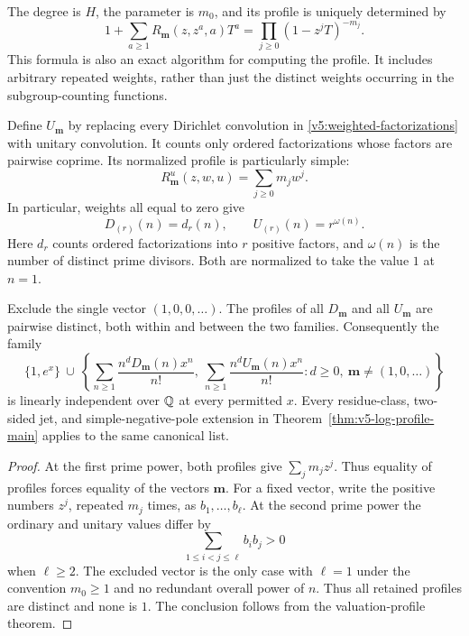 The degree is $H$, the parameter is $m_0$, and its profile is uniquely
determined by
\begin{equation}\label{v5:weighted-factorization-local}
 1+\sum_{a\geq1}R_{\mathbf m}(z,z^a,a)T^a
       =\prod_{j\geq0}(1-z^jT)^{-m_j}.
\end{equation}
This formula is also an exact algorithm for computing the profile.
It includes arbitrary repeated weights, rather than just the distinct
weights occurring in the subgroup-counting functions.

Define $U_{\mathbf m}$ by replacing every Dirichlet convolution in
\eqref{v5:weighted-factorizations} with unitary convolution.  It counts
only ordered factorizations whose factors are pairwise coprime.  Its
normalized profile is particularly simple:
\begin{equation}\label{v5:unitary-factorization-profile}
 R^u_{\mathbf m}(z,w,u)=\sum_{j\geq0}m_jw^j.
\end{equation}
In particular, weights all equal to zero give
\[
 D_{(r)}(n)=d_r(n),\qquad U_{(r)}(n)=r^{\omega(n)}.
\]
Here $d_r$ counts ordered factorizations into $r$ positive factors,
and $\omega(n)$ is the number of distinct prime divisors.  Both are
normalized to take the value $1$ at $n=1$.

\begin{corollary}
\label{v5:factorization-hierarchy}
Exclude the single vector $(1,0,0,\ldots)$.  The profiles of all
$D_{\mathbf m}$ and all $U_{\mathbf m}$ are pairwise distinct, both
within and between the two families.  Consequently the family
\[
 \{1,e^x\}\ \cup\
 \left\{\sum_{n\geq1}\frac{n^dD_{\mathbf m}(n)x^n}{n!},\
        \sum_{n\geq1}\frac{n^dU_{\mathbf m}(n)x^n}{n!}:
                d\geq0,\ \mathbf m\ne(1,0,\ldots)\right\}
\]
is linearly independent over $\mathbb Q$ at every permitted $x$.
Every residue-class, two-sided jet, and simple-negative-pole extension
in Theorem~\ref{thm:v5-log-profile-main} applies to the same canonical list.
\end{corollary}
\begin{proof}
At the first prime power, both profiles give
$\sum_jm_jz^j$.  Thus equality of profiles forces equality of the
vectors $\mathbf m$.  For a fixed vector, write the positive numbers
$z^j$, repeated $m_j$ times, as $b_1,\ldots,b_\ell$.  At the second
prime power the ordinary and unitary values differ by
\[
 \sum_{1\leq i<j\leq\ell}b_ib_j>0
\]
when $\ell\geq2$.  The excluded vector is the only case with
$\ell=1$ under the convention $m_0\geq1$ and no redundant overall
power of $n$.  Thus all retained profiles are distinct and none is $1$.
The conclusion follows from the valuation-profile theorem.
\end{proof}

